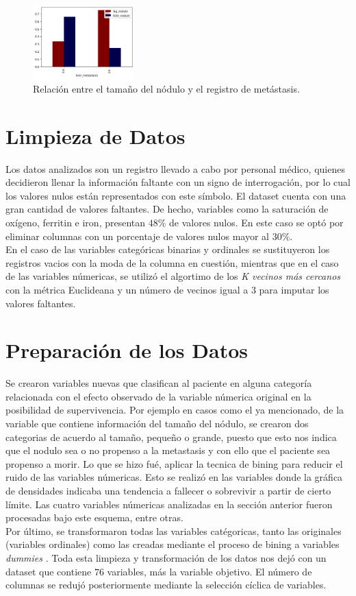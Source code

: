 \documentclass[6pt, twocolumn]{article}
\begin{document}
\begin{figure}
\centering
\includegraphics[width = 0.35\textwidth]{./met_nod.png}
\caption{\footnotesize \label{fig:metnod}Relación entre el tama\~no del nódulo y el registro de metástasis.}
\end{figure}

\section{Limpieza de Datos}
Los datos analizados son un registro llevado a cabo por personal médico, quienes decidieron llenar la información faltante con un signo de interrogación, por lo cual los valores nulos están representados con este símbolo. El dataset cuenta con una gran cantidad de valores faltantes. De hecho, variables como la saturación de oxígeno, ferritin e iron, presentan $48\%$ de valores nulos. En este caso se optó por eliminar columnas con un porcentaje de valores nulos mayor al $30\%$. \\
En el caso de las variables categóricas binarias y ordinales se sustituyeron los registros vacios con la moda de la columna en cuestión, mientras que en el caso de las variables númericas, se utilizó el algortimo de los \textit{K vecinos más cercanos} con la métrica Euclideana y un número de vecinos igual a $3$ para imputar los valores faltantes. 

\section{Preparación de los Datos}
Se crearon variables nuevas que clasifican al paciente en alguna categoría relacionada con el efecto observado de la variable númerica original en la posibilidad de supervivencia. Por ejemplo en casos como el ya mencionado, de la variable que contiene información del tama\~no del nódulo, se crearon dos categorias de acuerdo al tamaño, pequeño o grande, puesto que esto nos indica que el nodulo sea o no propenso a la metastasis y con ello que el  paciente sea propenso a morir. Lo que se hizo fué, aplicar la tecnica de bining para reducir el ruido de las variables númericas. Esto se realizó en las variables donde la gráfica de densidades indicaba una tendencia a fallecer o sobrevivir a partir de cierto límite. Las cuatro variables númericas analizadas en la sección anterior fueron procesadas bajo este esquema, entre otras.\\
Por último, se  transformaron todas las variables catégoricas, tanto las originales (variables ordinales) como las creadas mediante el proceso de bining a variables \textit{ dummies }. Toda esta limpieza y transformación de los datos nos dejó con un dataset que contiene $76$ variables, más la variable objetivo. El número de columnas se redujó posteriormente mediante la selección cíclica de variables.
\end{document}
